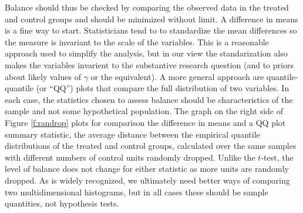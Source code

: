 \documentclass[11pt,titlepage]{article}
\begin{document}
Balance should thus be checked by comparing the observed data in the
treated and control groups and should be minimized without limit.  A
difference in means is a fine way to start.  Statisticians tend to to
standardize the mean differences so the measure is invariant to the
scale of the variables.  This is a reasonable approach used to
simplify the analysis, but in our view the standarization also makes
the variables invarient to the substantive research question (and to
priors about likely values of $\gamma$ or the equivalent).  A more
general approach are quantile-quantile (or ``QQ'') plots that compare
the full distribution of two variables.  In each case, the statistics
chosen to assess balance should be characteristics of the sample and
not some hypothetical population.  The graph on the right side of
Figure \ref{f:randrop} plots for comparison the difference in means
and a QQ plot summary statistic, the average distance between the
empirical quantile distributions of the treated and control groups,
calculated over the same samples with different numbers of control
units randomly dropped.  Unlike the $t$-test, the level of balance
does not change for either statistic as more units are randomly
dropped.  As is widely recognized, we ultimately need better ways of
comparing two multidimensional histograms, but in all cases these
should be sample quantities, not hypothesis tests.




\end{document}
